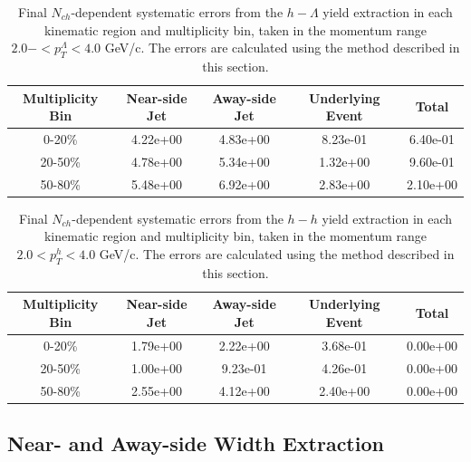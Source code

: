 \documentclass[ALICE,manyauthors]{ALICE_analysis_notes}
\begin{document}
\begin{table}[h!]
\centering
\begin{tabular}{| c || c | c | c | c | }
\hline
Multiplicity Bin & Near-side Jet & Away-side Jet & Underlying Event & Total  \\
\hline
0-20\% & 4.22e+00 & 4.83e+00  & 8.23e-01 & 6.40e-01 \\
20-50\% & 4.78e+00 & 5.34e+00  & 1.32e+00 & 9.60e-01 \\
50-80\% & 5.48e+00 & 6.92e+00  & 2.83e+00 & 2.10e+00 \\
\hline
\end{tabular}
\caption{Final $N_{ch}$-dependent systematic errors from the $h-\Lambda$ yield extraction in each kinematic region and multiplicity bin, taken in the momentum range $2.0- < p_{T}^{\Lambda} < 4.0$ GeV/c. The errors are calculated using the method described in this section.}
\label{h_lambda_yield_extraction_nch_dep_systematics}
\end{table}
\begin{table}[h!]
\centering
\begin{tabular}{| c || c | c | c | c | }
\hline
Multiplicity Bin & Near-side Jet & Away-side Jet & Underlying Event & Total  \\
\hline
0-20\% & 1.79e+00   & 2.22e+00  & 3.68e-01 & 0.00e+00 \\
20-50\% & 1.00e+00 & 9.23e-01  & 4.26e-01 & 0.00e+00 \\
50-80\% & 2.55e+00 & 4.12e+00  & 2.40e+00 & 0.00e+00 \\
\hline
\end{tabular}
\caption{Final $N_{ch}$-dependent systematic errors from the $h-h$ yield extraction in each kinematic region and multiplicity bin, taken in the momentum range $2.0 < p_{T}^{h} < 4.0$ GeV/c. The errors are calculated using the method described in this section.}
\label{h_h_yield_extraction_nch_dep_systematics}
\end{table}

\clearpage

\subsection{Near- and Away-side Width Extraction}
\label{width_extraction_systematics}
\end{document}
